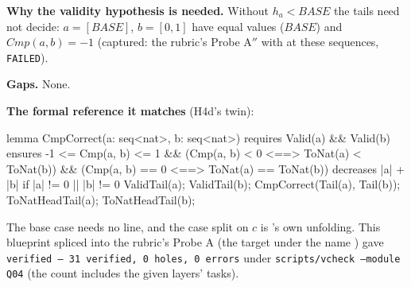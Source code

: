 \documentclass[11pt]{article}
\begin{document}
\textbf{Why the validity hypothesis is needed.} Without $h_a < \mathit{BASE}$
the tails need not decide: $a = [\mathit{BASE}]$, $b = [0, 1]$ have equal
values ($\mathit{BASE}$) and $\mathit{Cmp}(a, b) = -1$ (captured: the rubric's
Probe A$''$ with  at
these sequences, \texttt{FAILED}).

\textbf{Gaps.} None.

\textbf{The formal reference it matches} (H4d's twin):
\begin{dafnycode}
lemma CmpCorrect(a: seq<nat>, b: seq<nat>)
  requires Valid(a) && Valid(b)
  ensures -1 <= Cmp(a, b) <= 1
          && (Cmp(a, b) < 0 <==> ToNat(a) < ToNat(b))
          && (Cmp(a, b) == 0 <==> ToNat(a) == ToNat(b))
  decreases |a| + |b|
{
  if |a| != 0 || |b| != 0 {
    ValidTail(a);
    ValidTail(b);
    CmpCorrect(Tail(a), Tail(b));
    ToNatHeadTail(a);
    ToNatHeadTail(b);
  }
}
\end{dafnycode}
The base case needs no line, and the case split on $c$ is 's own
unfolding. This blueprint spliced into the rubric's Probe A (the target under
the name ) gave \texttt{verified --- 31 verified, 0 holes,
0 errors} under \texttt{scripts/vcheck --module Q04} (the count includes the
given layers' tasks).
\end{document}
